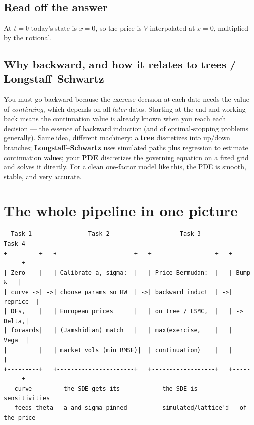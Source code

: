 \documentclass[11pt]{article}
\begin{document}
\subsection{Read off the answer}
At $t=0$ today's state is $x=0$, so the price is $V$ interpolated at $x=0$, multiplied by
the notional.

\subsection{Why backward, and how it relates to trees / Longstaff--Schwartz}
You must go backward because the exercise decision at each date needs the value of
\emph{continuing}, which depends on all \emph{later} dates. Starting at the end and working
back means the continuation value is already known when you reach each decision --- the
essence of backward induction (and of optimal-stopping problems generally). Same idea,
different machinery: a \textbf{tree} discretizes into up/down branches; \textbf{Longstaff--Schwartz}
uses simulated paths plus regression to estimate continuation values; your \textbf{PDE}
discretizes the governing equation on a fixed grid and solves it directly. For a clean
one-factor model like this, the PDE is smooth, stable, and very accurate.

\section{The whole pipeline in one picture}
\begin{lstlisting}
  Task 1                Task 2                    Task 3              Task 4
+---------+   +----------------------+   +------------------+   +----------+
| Zero    |   | Calibrate a, sigma:  |   | Price Bermudan:  |   | Bump &   |
| curve ->| ->| choose params so HW  | ->| backward induct  | ->| reprice  |
| DFs,    |   | European prices      |   | on tree / LSMC,  |   | -> Delta,|
| forwards|   | (Jamshidian) match   |   | max(exercise,    |   |    Vega  |
|         |   | market vols (min RMSE)|  | continuation)    |   |          |
+---------+   +----------------------+   +------------------+   +----------+
   curve         the SDE gets its            the SDE is            sensitivities
   feeds theta   a and sigma pinned          simulated/lattice'd   of the price
\end{lstlisting}
\end{document}
